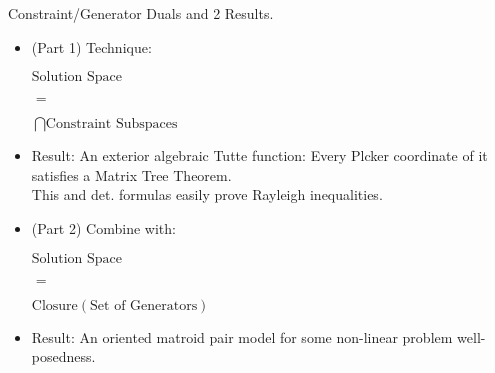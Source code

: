 \documentclass{article}
\newcommand{\Remph}[1]{{\color{red}#1}}
\begin{document}
\begin{frame}{Constraint/Generator Duals and 2 Results.}
\begin{minipage}{0.48\textwidth}

\begin{itemize}
\item
(Part 1) Technique:
\begin{center}$\text{Solution Space}$\end{center}
\begin{center}$=$\end{center}
\begin{center}$\bigcap \text{Constraint Subspaces}$\end{center}
\item
\Remph{Result:} An
exterior algebraic Tutte function: Every
Plcker coordinate of it satisfies a Matrix
Tree Theorem.\\
 
This and det. formulas
easily prove Rayleigh inequalities.
\end{itemize}

\end{minipage}
\begin{minipage}{0.48\textwidth}

\begin{itemize}
\item
(Part 2) Combine with:
\begin{center}$\text{Solution Space}$ \end{center}
\begin{center}$=$ \end{center}
\begin{center}$\text{Closure}(\text{Set of Generators})$\end{center}
\item
\Remph{Result:} 
An oriented matroid pair model
for some non-linear problem
well-posedness.
\end{itemize}
\end{minipage}
\end{frame}
\end{document}
